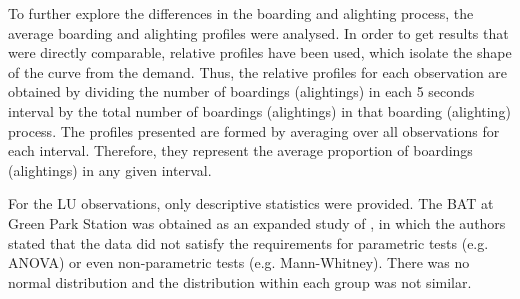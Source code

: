 To further explore the differences in the boarding and alighting process, the average boarding and alighting profiles were analysed. In order to get results that were directly comparable, relative profiles have been used, which isolate the shape of the curve from the demand. Thus, the relative profiles for each observation are obtained by dividing the number of boardings (alightings) in each 5 seconds interval by the total number of boardings (alightings) in that boarding (alighting) process. The profiles presented are formed by averaging over all observations for each interval. Therefore, they represent the average proportion of boardings (alightings) in any given interval.

For the LU observations, only descriptive statistics were provided. The BAT at Green Park Station was obtained as an expanded study of \cite{Ref27,Ref28,Ref29}, in which the authors stated that the data did not satisfy the requirements for parametric tests (e.g. ANOVA) or even non-parametric tests (e.g. Mann-Whitney). There was no normal distribution and the distribution within each group was not similar. 
